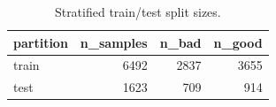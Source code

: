 \begin{table}
\caption{Stratified train/test split sizes.}
\label{tab:split}
\begin{tabular}{lrrr}
\toprule
partition & n\_samples & n\_bad & n\_good \\
\midrule
train & 6492 & 2837 & 3655 \\
test & 1623 & 709 & 914 \\
\bottomrule
\end{tabular}
\end{table}
